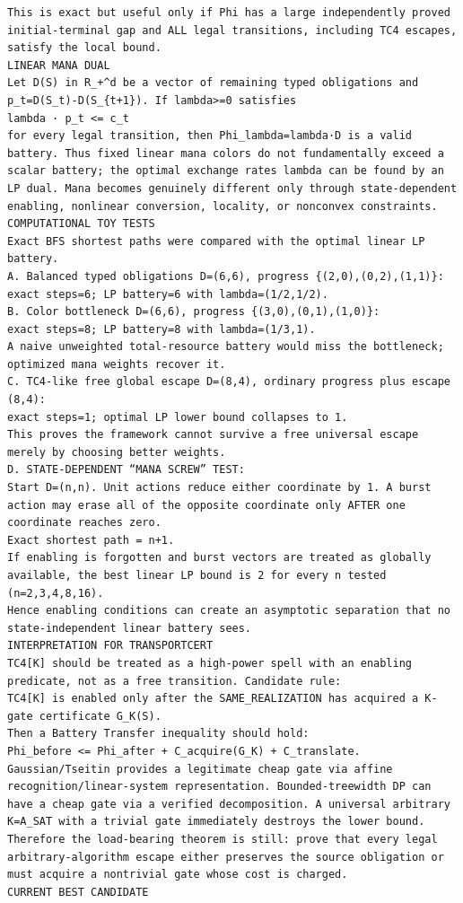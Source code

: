 \documentclass[11pt]{article}
\begin{document}
\begin{Verbatim}[breaklines=true,breakanywhere=true]
This is exact but useful only if Phi has a large independently proved initial-terminal gap and ALL legal transitions, including TC4 escapes, satisfy the local bound.
LINEAR MANA DUAL
Let D(S) in R_+^d be a vector of remaining typed obligations and p_t=D(S_t)-D(S_{t+1}). If lambda>=0 satisfies
lambda · p_t <= c_t
for every legal transition, then Phi_lambda=lambda·D is a valid battery. Thus fixed linear mana colors do not fundamentally exceed a scalar battery; the optimal exchange rates lambda can be found by an LP dual. Mana becomes genuinely different only through state-dependent enabling, nonlinear conversion, locality, or nonconvex constraints.
COMPUTATIONAL TOY TESTS
Exact BFS shortest paths were compared with the optimal linear LP battery.
A. Balanced typed obligations D=(6,6), progress {(2,0),(0,2),(1,1)}:
exact steps=6; LP battery=6 with lambda=(1/2,1/2).
B. Color bottleneck D=(6,6), progress {(3,0),(0,1),(1,0)}:
exact steps=8; LP battery=8 with lambda=(1/3,1).
A naive unweighted total-resource battery would miss the bottleneck; optimized mana weights recover it.
C. TC4-like free global escape D=(8,4), ordinary progress plus escape (8,4):
exact steps=1; optimal LP lower bound collapses to 1.
This proves the framework cannot survive a free universal escape merely by choosing better weights.
D. STATE-DEPENDENT “MANA SCREW” TEST:
Start D=(n,n). Unit actions reduce either coordinate by 1. A burst action may erase all of the opposite coordinate only AFTER one coordinate reaches zero.
Exact shortest path = n+1.
If enabling is forgotten and burst vectors are treated as globally available, the best linear LP bound is 2 for every n tested (n=2,3,4,8,16).
Hence enabling conditions can create an asymptotic separation that no state-independent linear battery sees.
INTERPRETATION FOR TRANSPORTCERT
TC4[K] should be treated as a high-power spell with an enabling predicate, not as a free transition. Candidate rule:
TC4[K] is enabled only after the SAME_REALIZATION has acquired a K-gate certificate G_K(S).
Then a Battery Transfer inequality should hold:
Phi_before <= Phi_after + C_acquire(G_K) + C_translate.
Gaussian/Tseitin provides a legitimate cheap gate via affine recognition/linear-system representation. Bounded-treewidth DP can have a cheap gate via a verified decomposition. A universal arbitrary K=A_SAT with a trivial gate immediately destroys the lower bound. Therefore the load-bearing theorem is still: prove that every legal arbitrary-algorithm escape either preserves the source obligation or must acquire a nontrivial gate whose cost is charged.
CURRENT BEST CANDIDATE

\end{Verbatim}
\end{document}
